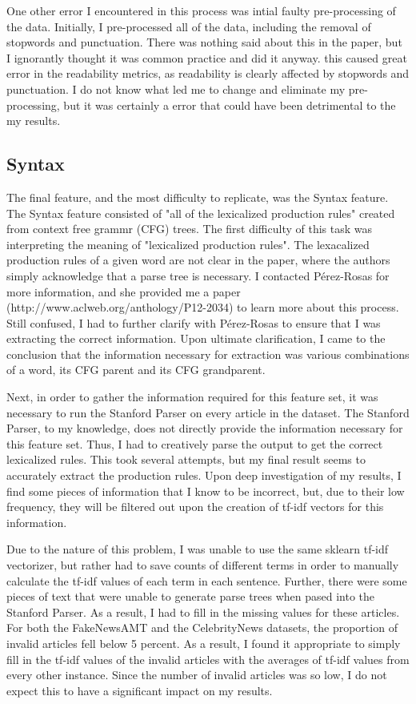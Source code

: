 \documentclass{article}
\begin{document}
One other error I encountered in this process was intial faulty pre-processing of the data. Initially, I pre-processed all of the data, including the removal of stopwords and punctuation. There was nothing said about this in the paper, but I ignorantly thought it was common practice and did it anyway. this caused great error in the readability metrics, as readability is clearly affected by stopwords and punctuation. I do not know what led me to change and eliminate my pre-processing, but it was certainly a error that could have been detrimental to the my results.

\subsection{Syntax}

The final feature, and the most difficulty to replicate, was the Syntax feature. The Syntax feature consisted of "all of the lexicalized production rules" created from context free grammr (CFG) trees. The first difficulty of this task was interpreting the meaning of "lexicalized production rules". The lexacalized production rules of a given word are not clear in the paper, where the authors simply acknowledge that a parse tree is necessary. I contacted P\'erez-Rosas for more information, and she provided me a paper (http://www.aclweb.org/anthology/P12-2034) to learn more about this process. Still confused, I had to further clarify with P\'erez-Rosas to ensure that I was extracting the correct information. Upon ultimate clarification, I came to the conclusion that the information necessary for extraction was various combinations of a word, its CFG parent and its CFG grandparent.

Next, in order to gather the information required for this feature set, it was necessary to run the Stanford Parser on every article in the dataset. The Stanford Parser, to my knowledge, does not directly provide the information necessary for this feature set. Thus, I had to creatively parse the output to get the correct lexicalized rules. This took several attempts, but my final result seems to accurately extract the production rules. Upon deep investigation of my results, I find some pieces of information that I know to be incorrect, but, due to their low frequency, they will be filtered out upon the creation of tf-idf vectors for this information. 

Due to the nature of this problem, I was unable to use the same sklearn tf-idf vectorizer, but rather had to save counts of different terms in order to manually calculate the tf-idf values of each term in each sentence. Further, there were some pieces of text that were unable to generate parse trees when pased into the Stanford Parser. As a result, I had to fill in the missing values for these articles. For both the FakeNewsAMT and the CelebrityNews datasets, the proportion of invalid articles fell below 5 percent. As a result, I found it appropriate to simply fill in the tf-idf values of the invalid articles with the averages of tf-idf values from every other instance. Since the number of invalid articles was so low, I do not expect this to have a significant impact on my results.
\end{document}
